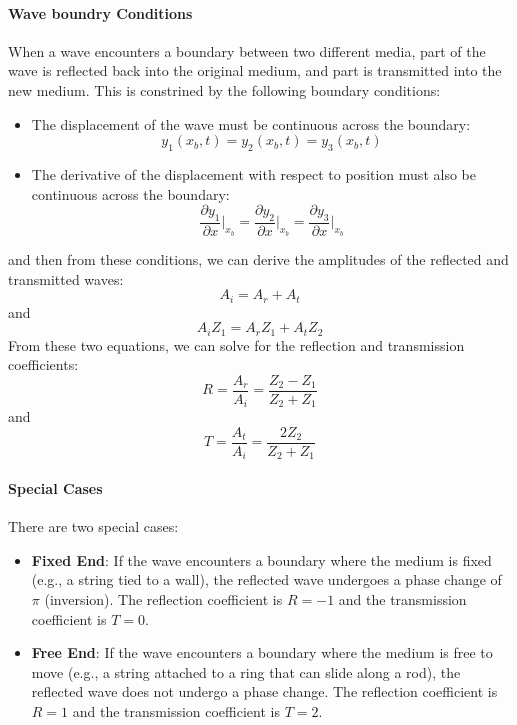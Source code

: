 \documentclass[11pt]{report}
\begin{document}
\paragraph{Wave boundry Conditions} When a wave encounters a boundary between two different media, part of the wave is reflected back into the original medium, and part is transmitted into the new medium. This is constrined by the following boundary conditions:
\begin{itemize}
    \item The displacement of the wave must be continuous across the boundary:
    $$
        y_1(x_b, t) = y_2(x_b, t) = y_3(x_b, t)
    $$
    \item The derivative of the displacement with respect to position must also be continuous across the boundary:
    $$
        \frac{\partial y_1}{\partial x}\bigg|_{x_b} = \frac{\partial y_2}{\partial x}\bigg|_{x_b} = \frac{\partial y_3}{\partial x}\bigg|_{x_b}
    $$
\end{itemize}
and then from these conditions, we can derive the amplitudes of the reflected and transmitted waves:
\begin{equation}\label{eq:amp-continuity}
    A_i = A_r + A_t
\end{equation}
and 
$$
    A_i Z_1 = A_r Z_1 + A_t Z_2
$$
From these two equations, we can solve for the reflection and transmission coefficients:
\begin{equation}\label{eq:reflection_coeff}
    R = \frac{A_r}{A_i} = \frac{Z_2 - Z_1}{Z_2 + Z_1}
\end{equation}
and
\begin{equation}\label{eq:transmission_coeff}
    T = \frac{A_t}{A_i} = \frac{2Z_2}{Z_2 + Z_1}
\end{equation}

\paragraph{Special Cases} There are two special cases:
\begin{itemize}
    \item \textbf{Fixed End}: If the wave encounters a boundary where the medium is fixed (e.g., a string tied to a wall), the reflected wave undergoes a phase change of \( \pi \) (inversion). The reflection coefficient is \( R = -1 \) and the transmission coefficient is \( T = 0 \).
    \item \textbf{Free End}: If the wave encounters a boundary where the medium is free to move (e.g., a string attached to a ring that can slide along a rod), the reflected wave does not undergo a phase change. The reflection coefficient is \( R = 1 \) and the transmission coefficient is \( T = 2 \).
\end{itemize}
\end{document}
